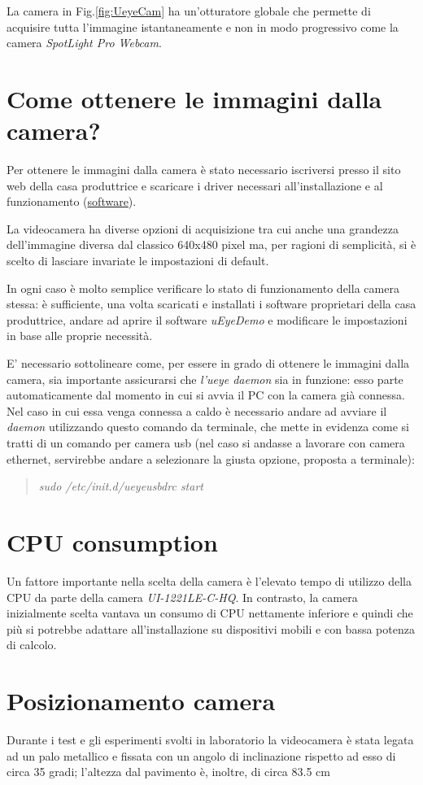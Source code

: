 La camera in Fig.\ref{fig:UeyeCam} ha un'otturatore globale che permette di acquisire tutta l'immagine istantaneamente e non in modo progressivo come la camera  \textit{SpotLight Pro Webcam}.

\section{Come ottenere le immagini dalla camera?}
Per ottenere le immagini dalla camera è stato necessario iscriversi presso il sito web della casa produttrice e scaricare i driver necessari all'installazione e al funzionamento (\href{https://en.ids-imaging.com/manuals-ueye-software.html}{software}).

La videocamera ha diverse opzioni di acquisizione tra cui anche una grandezza dell'immagine diversa dal classico 640x480 pixel ma, per ragioni di semplicità, si è scelto di lasciare invariate le impostazioni di default.

In ogni caso è molto semplice verificare lo stato di funzionamento della camera stessa: è sufficiente, una volta scaricati e installati i software proprietari della casa produttrice, andare ad aprire il software \textit{uEyeDemo} e modificare le impostazioni in base alle proprie necessità.

E' necessario sottolineare come, per essere in grado di ottenere le immagini dalla camera, sia importante assicurarsi che \textit{l'ueye daemon} sia in funzione: esso parte automaticamente dal momento in cui si avvia il PC con la camera già connessa. Nel caso in cui essa venga connessa a caldo è necessario andare ad avviare il \textit{daemon} utilizzando questo comando da terminale, che mette in evidenza come si tratti di un comando per camera usb (nel caso si andasse a lavorare con camera ethernet, servirebbe andare a selezionare la giusta opzione, proposta a terminale):

\begin{quotation}
	\textsl{sudo /etc/init.d/ueyeusbdrc start}
\end{quotation}


\section{CPU consumption}
Un fattore importante nella scelta della camera è l'elevato tempo di utilizzo della CPU da parte della camera \textit{UI-1221LE-C-HQ}. In contrasto, la camera inizialmente scelta vantava un consumo di CPU nettamente inferiore e quindi che più si potrebbe adattare all'installazione su dispositivi mobili e con bassa potenza di calcolo.

\section{Posizionamento camera}

Durante i test e gli esperimenti svolti in laboratorio la videocamera è stata legata ad un palo metallico e fissata con un angolo di inclinazione rispetto ad esso di circa 35 gradi; l'altezza dal pavimento è, inoltre, di circa 83.5 cm


